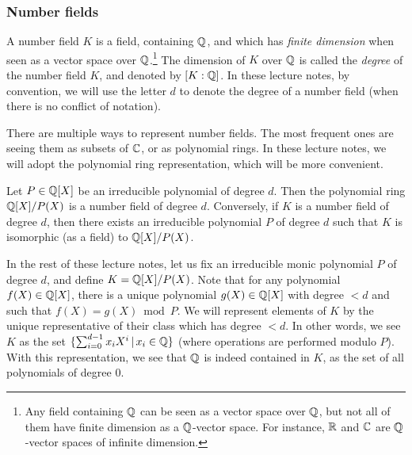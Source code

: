 \subsubsection{Number fields}

A number field $K$ is a field, containing $\mathbb{Q}$, and which has \emph{finite dimension} when seen as a vector space over $\mathbb{Q}$.\footnote{Any field containing $\mathbb{Q}$ can be seen as a vector space over $\mathbb{Q}$, but not all of them have finite dimension as a $\mathbb{Q}$-vector space. For instance, $\mathbb{R}$ and $\mathbb{C}$ are $\mathbb{Q}$-vector spaces of infinite dimension.} The dimension of $K$ over $\mathbb{Q}$ is called the \emph{degree} of the number field $K$, and denoted by $[K:\mathbb{Q}]$. In these lecture notes, by convention, we will use the letter $d$ to denote the degree of a number field (when there is no conflict of notation).

There are multiple ways to represent number fields. The most frequent ones are seeing them as subsets of $\mathbb{C}$, or as polynomial rings. In these lecture notes, we will adopt the polynomial ring representation, which will be more convenient.

\begin{lemma}
\label{le:nb-field-eq-def}
Let $P \in \mathbb{Q}[X]$ be an irreducible polynomial of degree $d$. Then the polynomial ring $\mathbb{Q}[X]/P(X)$ is a number field of degree $d$.
Conversely, if $K$ is a number field of degree $d$, then there exists an irreducible polynomial $P$ of degree $d$ such that $K$ is isomorphic (as a field) to $\mathbb{Q}[X]/P(X)$.
\end{lemma}

In the rest of these lecture notes, let us fix an irreducible monic polynomial $P$ of degree $d$, and define $K = \mathbb{Q}[X]/P(X)$. Note that for any polynomial $f(X) \in \mathbb{Q}[X]$, there is a unique polynomial $g(X) \in \mathbb{Q}[X]$ with degree $< d$ and such that $f(X) = g(X) \bmod P$. We will represent elements of $K$ by the unique representative of their class which has degree $< d$. In other words, we see $K$ as the set $\{\sum_{i = 0}^{d-1} x_i X^i\,|\, x_i \in \mathbb{Q}\}$ (where operations are performed modulo $P$). With this representation, we see that $\mathbb{Q}$ is indeed contained in $K$, as the set of all polynomials of degree $0$.


